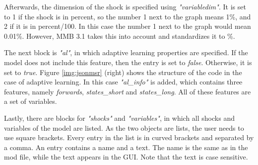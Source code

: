 Afterwards, the dimension of the shock is specified using \textit{"variabledim"}. It is set to 1 if the shock is in percent, so the number 1 next to the graph means 1\%, and 2 if it is in percent/100. In this case the number 1 next to the graph would mean 0.01\%. However, MMB 3.1 takes this into account and standardizes it to \%.

The next block is \textit{"al"}, in which adaptive learning properties are specified. If the model does not include this feature, then the entry is set to \textit{false}. Otherwise, it is set to \textit{true}. Figure \ref{img:jsonmsr} (right) shows the structure of the code in the case of adaptive learning. In this case \textit{"al\_info"} is added, which contains three features, namely \textit{forwards}, \textit{states\_short} and \textit{states\_long}. All of these features are a set of variables. 

Lastly, there are blocks for \textit{"shocks"} and \textit{"variables"}, in which all shocks and variables of the model are listed. As the two objects are lists, the user needs to use square brackets. Every entry in the list is in curved brackets and separated by a comma. An entry contains a name and a text. The name is the same as in the mod file, while the text appears in the GUI. Note that the text is case sensitive.